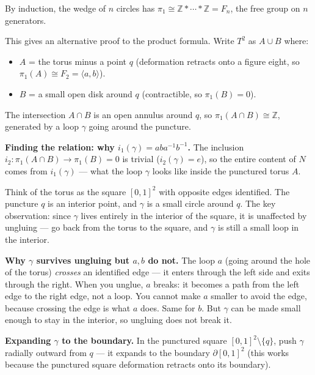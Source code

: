\documentclass[11pt]{report}
\begin{document}
\begin{exbox}
By induction, the wedge of $n$ circles has $\pi_1 \cong \mathbb{Z} * \cdots * \mathbb{Z} = F_n$, the free group on $n$ generators.
\end{exbox}

\begin{exbox}
This gives an alternative proof to the product formula. Write $T^2$ as $A \cup B$ where:
\begin{itemize}[nosep]
    \item $A$ = the torus minus a point $q$ (deformation retracts onto a figure eight, so $\pi_1(A) \cong F_2 = \langle a, b \rangle$).
    \item $B$ = a small open disk around $q$ (contractible, so $\pi_1(B) = 0$).
\end{itemize}
The intersection $A \cap B$ is an open annulus around $q$, so $\pi_1(A \cap B) \cong \mathbb{Z}$, generated by a loop $\gamma$ going around the puncture.

\textbf{Finding the relation: why $i_1(\gamma) = aba^{-1}b^{-1}$.} The inclusion $i_2: \pi_1(A \cap B) \to \pi_1(B) = 0$ is trivial ($i_2(\gamma) = e$), so the entire content of $N$ comes from $i_1(\gamma)$ --- what the loop $\gamma$ looks like inside the punctured torus $A$.

Think of the torus as the square $[0,1]^2$ with opposite edges identified. The puncture $q$ is an interior point, and $\gamma$ is a small circle around $q$. The key observation: since $\gamma$ lives entirely in the interior of the square, it is unaffected by ungluing --- go back from the torus to the square, and $\gamma$ is still a small loop in the interior.

\textbf{Why $\gamma$ survives ungluing but $a, b$ do not.} The loop $a$ (going around the hole of the torus) \emph{crosses} an identified edge --- it enters through the left side and exits through the right. When you unglue, $a$ breaks: it becomes a path from the left edge to the right edge, not a loop. You cannot make $a$ smaller to avoid the edge, because crossing the edge is what $a$ does. Same for $b$. But $\gamma$ can be made small enough to stay in the interior, so ungluing does not break it.

\textbf{Expanding $\gamma$ to the boundary.} In the punctured square $[0,1]^2 \setminus \{q\}$, push $\gamma$ radially outward from $q$ --- it expands to the boundary $\partial[0,1]^2$ (this works because the punctured square deformation retracts onto its boundary).


\end{exbox}
\end{document}
